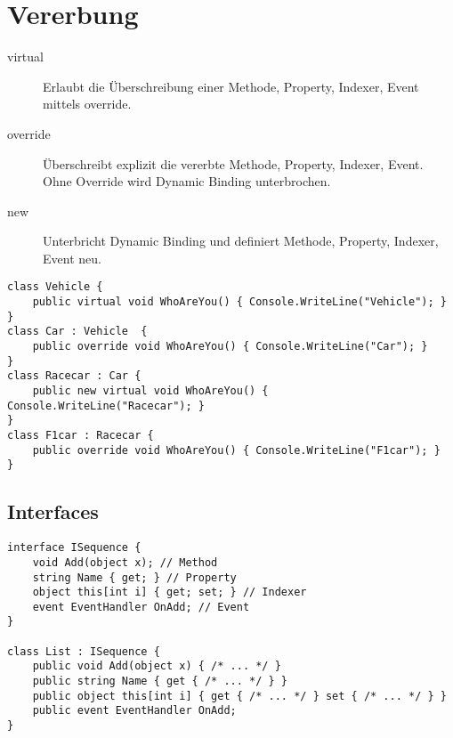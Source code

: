 \section{Vererbung}
\begin{description}
  \item[virtual] Erlaubt die Überschreibung einer Methode, Property, Indexer, Event mittels override.
  \item[override] Überschreibt explizit die vererbte Methode, Property, Indexer, Event. Ohne Override wird Dynamic Binding unterbrochen.
  \item[new] Unterbricht Dynamic Binding und definiert Methode, Property, Indexer, Event neu. 
\end{description}

\begin{lstlisting}
class Vehicle {
    public virtual void WhoAreYou() { Console.WriteLine("Vehicle"); }
}
class Car : Vehicle  {
    public override void WhoAreYou() { Console.WriteLine("Car"); }
}
class Racecar : Car {
    public new virtual void WhoAreYou() { Console.WriteLine("Racecar"); }
}
class F1car : Racecar {
    public override void WhoAreYou() { Console.WriteLine("F1car"); }
}
\end{lstlisting}

\subsection{Interfaces}
\begin{lstlisting}
interface ISequence {
	void Add(object x); // Method 
	string Name { get; } // Property 
	object this[int i] { get; set; } // Indexer 
	event EventHandler OnAdd; // Event 
}

class List : ISequence {
	public void Add(object x) { /* ... */ }
	public string Name { get { /* ... */ } }
	public object this[int i] { get { /* ... */ } set { /* ... */ } } 
	public event EventHandler OnAdd;
}
\end{lstlisting}